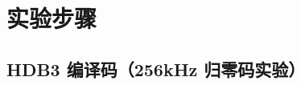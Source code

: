 \documentclass[../main]{subfiles}
\begin{document}
\section{实验步骤}%
\label{sec:\arabic{chapter}procedure}

\subsection{HDB3 编译码（256kHz 归零码实验）}%
\label{sub:rz}


\end{document}
